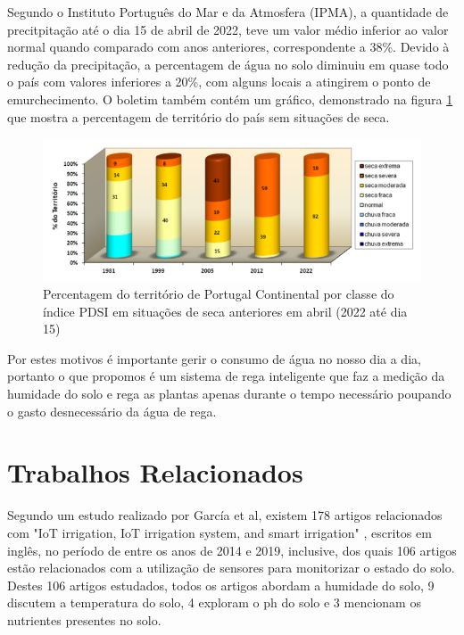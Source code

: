 \documentclass[conference]{IEEEtran}
\begin{document}
Segundo o Instituto Português do Mar e da Atmosfera (IPMA), 
a quantidade de precitpitação até o dia 15 de abril de 2022, teve um valor médio inferior ao valor normal 
quando comparado com anos anteriores, correspondente a 38\%. Devido à redução da precipitação, 
a percentagem de água no solo diminuiu em quase todo o país com valores inferiores a 20\%, com alguns locais 
a atingirem o ponto de emurchecimento. O boletim também contém um gráfico, demonstrado na figura \ref{fig:ipmagraph} 
que mostra a percentagem de território do país sem situações de seca. \cite{ipmaboletim}

\begin{figure}[h]
    \centering
    \includegraphics[scale=0.5]{grafico-seca-portugal.png}
    \caption{Percentagem do território de Portugal Continental por classe do índice PDSI em situações de seca anteriores em abril (2022 até dia 15)}
    \label{fig:ipmagraph}
\end{figure}

Por estes motivos é importante gerir o consumo de água no nosso dia a dia, 
portanto o que propomos é um sistema de rega inteligente que faz a 
medição da humidade do solo e rega as plantas apenas durante o tempo 
necessário poupando o gasto desnecessário da água de rega.

\section{Trabalhos Relacionados}

Segundo um estudo realizado por García et al, existem 178 artigos 
relacionados com  "IoT irrigation, IoT irrigation system, and smart 
irrigation" \cite{garcia2020iot}, escritos em inglês, no período de entre os 
anos de 2014 e 2019, inclusive, dos quais 106 artigos estão relacionados com a 
utilização de sensores para monitorizar o estado do solo. Destes 106 artigos 
estudados, todos os artigos abordam a humidade do solo, 9 discutem a temperatura 
do solo, 4 exploram o ph do solo e 3 mencionam os nutrientes presentes no solo.
\end{document}
